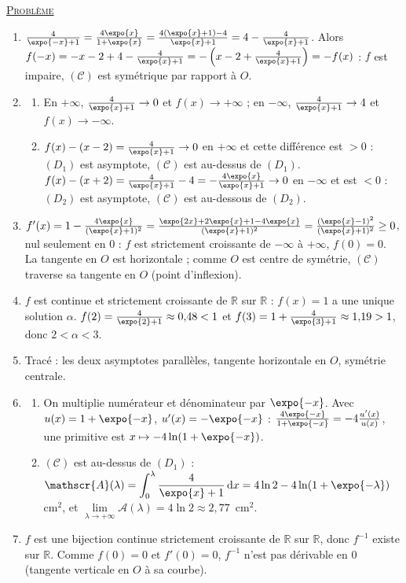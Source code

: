 \begin{corrige}
\noindent \underline{\textsc{Probl\`eme}}
\begin{enumerate}
\item $\frac{4}{\expo{-x} + 1} = \frac{4\expo{x}}{1 + \expo{x}} = \frac{4(\expo{x} + 1) - 4}{\expo{x} + 1} = 4 - \frac{4}{\expo{x} + 1}$.
      Alors $f(-x) = -x - 2 + 4 - \frac{4}{\expo{x} + 1} = -\left(x - 2 + \frac{4}{\expo{x} + 1}\right) = -f(x)$ : $f$ est impaire,
      $(\mathscr{C})$ est sym\'etrique par rapport \`a $O$.
\item \begin{enumerate}
      \item En $+\infty$, $\frac{4}{\expo{x} + 1} \to 0$ et $f(x) \to +\infty$ ; en $-\infty$, $\frac{4}{\expo{x} + 1} \to 4$ et $f(x) \to -\infty$.
      \item $f(x) - (x - 2) = \frac{4}{\expo{x} + 1} \to 0$ en $+\infty$ et cette diff\'erence est $> 0$ : $(D_1)$ est asymptote,
            $(\mathscr{C})$ est au-dessus de $(D_1)$. $f(x) - (x + 2) = \frac{4}{\expo{x} + 1} - 4 = -\frac{4\expo{x}}{\expo{x} + 1} \to 0$
            en $-\infty$ et est $< 0$ : $(D_2)$ est asymptote, $(\mathscr{C})$ est au-dessous de $(D_2)$.
      \end{enumerate}
\item $f'(x) = 1 - \frac{4\expo{x}}{(\expo{x} + 1)^2} = \frac{\expo{2x} + 2\expo{x} + 1 - 4\expo{x}}{(\expo{x} + 1)^2} = \frac{(\expo{x} - 1)^2}{(\expo{x} + 1)^2} \geq 0$,
      nul seulement en $0$ : $f$ est strictement croissante de $-\infty$ \`a $+\infty$, $f(0) = 0$. La tangente en $O$ est horizontale ;
      comme $O$ est centre de sym\'etrie, $(\mathscr{C})$ traverse sa tangente en $O$ (point d'inflexion).
\item $f$ est continue et strictement croissante de $\mathbb{R}$ sur $\mathbb{R}$ : $f(x) = 1$ a une unique solution $\alpha$.
      $f(2) = \frac{4}{\expo{2} + 1} \approx 0{,}48 < 1$ et $f(3) = 1 + \frac{4}{\expo{3} + 1} \approx 1{,}19 > 1$, donc $2 < \alpha < 3$.
\item Trac\'e : les deux asymptotes parall\`eles, tangente horizontale en $O$, sym\'etrie centrale.
\item \begin{enumerate}
      \item On multiplie num\'erateur et d\'enominateur par $\expo{-x}$. Avec $u(x) = 1 + \expo{-x}$, $u'(x) = -\expo{-x}$ :
            $\frac{4\expo{-x}}{1 + \expo{-x}} = -4\frac{u'(x)}{u(x)}$, une primitive est $x \mapsto -4\ln(1 + \expo{-x})$.
      \item $(\mathscr{C})$ est au-dessus de $(D_1)$ : $\mathscr{A}(\lambda) = \displaystyle\int_0^\lambda \frac{4}{\expo{x} + 1}\,\mathrm{d}x
            = 4\ln 2 - 4\ln(1 + \expo{-\lambda})$ cm$^2$, et $\lim\limits_{\lambda \to +\infty} \mathscr{A}(\lambda) = 4\ln 2 \approx 2{,}77$~cm$^2$.
      \end{enumerate}
\item $f$ est une bijection continue strictement croissante de $\mathbb{R}$ sur $\mathbb{R}$, donc $f^{-1}$ existe sur $\mathbb{R}$.
      Comme $f(0) = 0$ et $f'(0) = 0$, $f^{-1}$ n'est pas d\'erivable en $0$ (tangente verticale en $O$ \`a sa courbe).
\end{enumerate}


\end{corrige}

